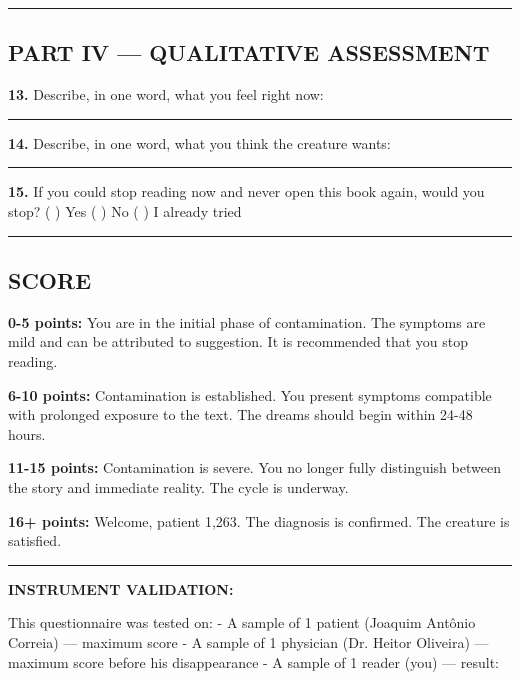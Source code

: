 \vspace{0.5em}\noindent\rule{\textwidth}{0.5pt}\vspace{0.5em}

\subsection*{PART IV --- QUALITATIVE ASSESSMENT}

\noindent \textbf{13.} Describe, in one word, what you feel right now:

\noindent\rule{0.92\textwidth}{0.4pt}

\noindent \textbf{14.} Describe, in one word, what you think the creature wants:

\noindent\rule{0.92\textwidth}{0.4pt}

\noindent \textbf{15.} If you could stop reading now and never open this book again, would you stop?
( ) Yes
( ) No
( ) I already tried

\vspace{0.5em}\noindent\rule{\textwidth}{0.5pt}\vspace{0.5em}

\subsection*{SCORE}

\noindent \textbf{0-5 points:} You are in the initial phase of contamination. The symptoms are mild and can be attributed to suggestion. It is recommended that you stop reading.

\noindent \textbf{6-10 points:} Contamination is established. You present symptoms compatible with prolonged exposure to the text. The dreams should begin within 24-48 hours.

\noindent \textbf{11-15 points:} Contamination is severe. You no longer fully distinguish between the story and immediate reality. The cycle is underway.

\noindent \textbf{16+ points:} Welcome, patient 1,263. The diagnosis is confirmed. The creature is satisfied.

\vspace{0.5em}\noindent\rule{\textwidth}{0.5pt}\vspace{0.5em}

\noindent \textbf{INSTRUMENT VALIDATION:}

\noindent This questionnaire was tested on:
- A sample of 1 patient (Joaquim Antônio Correia) --- maximum score
- A sample of 1 physician (Dr. Heitor Oliveira) --- maximum score before his disappearance
- A sample of 1 reader (you) --- result: \makebox[2in]{\hrulefill}

